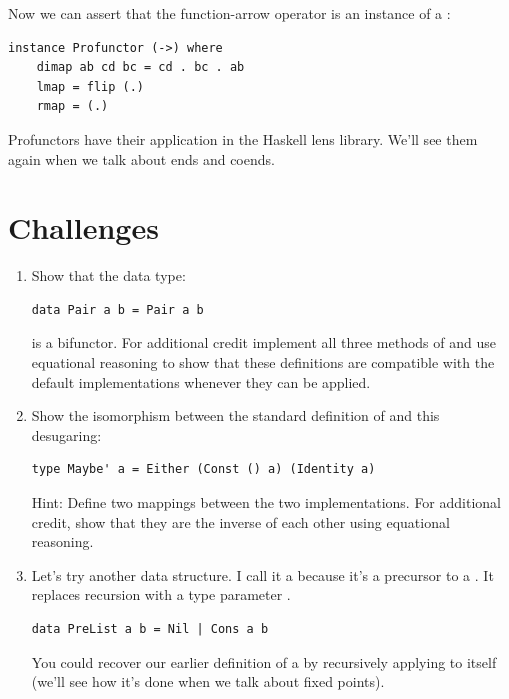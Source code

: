 \noindent
Now we can assert that the function-arrow operator is an instance of a
:

\begin{Verbatim}[commandchars=\\\{\}]
instance Profunctor (->) where
    dimap ab cd bc = cd . bc . ab
    lmap = flip (.)
    rmap = (.)
\end{Verbatim}
Profunctors have their application in the Haskell lens library. We'll
see them again when we talk about ends and coends.

\section{Challenges}\label{challenges}

\begin{enumerate}
\tightlist
\item
  Show that the data type:

\begin{Verbatim}[commandchars=\\\{\}]
data Pair a b = Pair a b
\end{Verbatim}

  is a bifunctor. For additional credit implement all three methods of
   and use equational reasoning to show that these
  definitions are compatible with the default implementations whenever
  they can be applied.
\item
  Show the isomorphism between the standard definition of 
  and this desugaring:

\begin{Verbatim}[commandchars=\\\{\}]
type Maybe' a = Either (Const () a) (Identity a)
\end{Verbatim}

  Hint: Define two mappings between the two implementations. For
  additional credit, show that they are the inverse of each other using
  equational reasoning.
\item
  Let's try another data structure. I call it a  because
  it's a precursor to a . It replaces recursion with a type
  parameter .

\begin{Verbatim}[commandchars=\\\{\}]
data PreList a b = Nil | Cons a b
\end{Verbatim}

  You could recover our earlier definition of a  by
  recursively applying  to itself (we'll see how it's
  done when we talk about fixed points).


\end{enumerate}
